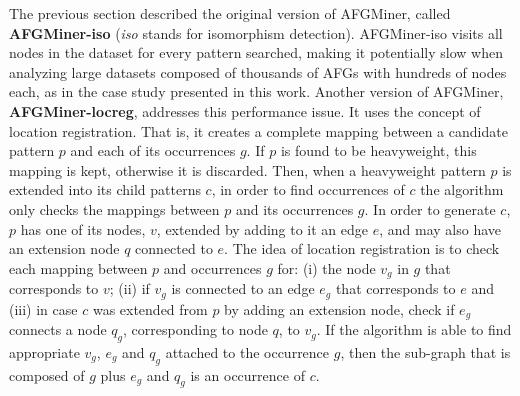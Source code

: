 The previous section described the original version of AFGMiner, called {\bf AFGMiner-iso} (\emph{iso} stands for isomorphism detection). AFGMiner-iso visits all nodes in the dataset for every pattern searched, making it potentially slow when analyzing large datasets composed of thousands of AFGs with hundreds of nodes each, as in the case study presented in this work. Another version of AFGMiner, {\bf AFGMiner-locreg}, addresses this performance issue. It uses the concept of location registration. That is, it creates a complete mapping between a candidate pattern $p$ and each of its occurrences $g$. If $p$ is found to be heavyweight, this mapping is kept, otherwise it is discarded. Then, when a heavyweight pattern $p$ is extended into its child patterns $c$, in order to find occurrences of $c$ the algorithm only checks the mappings between $p$ and its occurrences $g$. In order to generate $c$, $p$ has one of its nodes, $v$, extended by adding to it an edge $e$, and may also have an extension node $q$ connected to $e$. The idea of location registration is to check each mapping between $p$ and occurrences $g$ for: (i) the node $v_g$ in $g$ that corresponds to $v$; (ii) if $v_g$ is connected to an edge $e_g$ that corresponds to $e$ and (iii) in case $c$ was extended from $p$ by adding an extension node, check if $e_g$ connects a node $q_g$, corresponding to node $q$, to $v_g$. If the algorithm is able to find appropriate $v_g$, $e_g$ and $q_g$ attached to the occurrence $g$, then the sub-graph that is composed of $g$ plus $e_g$ and $q_g$ is an occurrence of $c$.






